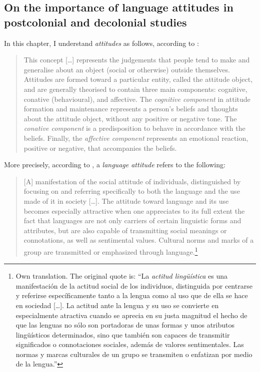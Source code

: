\documentclass[output=paper]{langscibook}
\begin{document}
\subsection{On the importance of language attitudes in postcolonial and decolonial studies}\label{schlumpf:sec:importance}

In this chapter, I understand \textit{attitudes} as follows, according to \citet[596, emphasis in original]{gallois_attitudes_2007}:

\begin{quote}
This concept […] represents the judgements that people tend to make and generalise about an object (social or otherwise) outside themselves. Attitudes are formed toward a particular entity, called the attitude object, and are generally theorised to contain three main components: cognitive, conative (behavioural), and affective. The \textit{cognitive component} in attitude formation and maintenance represents a person’s beliefs and thoughts about the attitude object, without any positive or negative tone. The \textit{conative component} is a predisposition to behave in accordance with the beliefs. Finally, the \textit{affective component} represents an emotional reaction, positive or negative, that accompanies the beliefs.
\end{quote}

More precisely, according to \citet[177-178]{moreno_fernandez_principios_2015}, a \textit{language attitude} refers to the following:

\begin{quote}
[A] manifestation of the social attitude of individuals, distinguished by focusing on and referring specifically to both the language and the use made of it in society […]. The attitude toward language and its use becomes especially attractive when one appreciates to its full extent the fact that languages are not only carriers of certain linguistic forms and attributes, but are also capable of transmitting social meanings or connotations, as well as sentimental values. Cultural norms and marks of a group are transmitted or emphasized through language.\footnote{Own translation. The original quote is: “La \textit{actitud lingüística} es una manifestación de la actitud social de los individuos, distinguida por centrarse y referirse específicamente tanto a la lengua como al uso que de ella se hace en sociedad […]. La actitud ante la lengua y su uso se convierte en especialmente atractiva cuando se aprecia en su justa magnitud el hecho de que las lenguas no sólo son portadoras de unas formas y unos atributos lingüísticos determinados, sino que también son capaces de transmitir significados o connotaciones sociales, además de valores sentimentales. Las normas y marcas culturales de un grupo se transmiten o enfatizan por medio de la lengua.”}
\end{quote}
\end{document}
